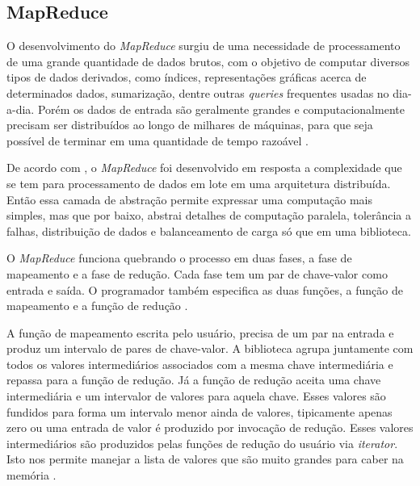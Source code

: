         \subsection{MapReduce}

            O desenvolvimento do \textit{MapReduce} surgiu de uma necessidade de processamento de uma grande
            quantidade de dados brutos, com o objetivo  de computar diversos tipos de dados derivados, como índices,
            representações gráficas acerca de determinados dados, sumarização, dentre outras \textit{queries} frequentes
            usadas no dia-a-dia. Porém os dados de entrada são geralmente grandes e computacionalmente precisam ser
            distribuídos ao longo de milhares de máquinas, para que seja possível de terminar em uma quantidade de
            tempo razoável \cite{dean2008}.

            De acordo com , o \textit{MapReduce} foi desenvolvido em resposta a complexidade
            que se tem para processamento de dados em lote em uma arquitetura distribuída. Então essa camada de
            abstração permite expressar uma computação mais simples, mas que por baixo, abstrai detalhes de computação
            paralela, tolerância a falhas, distribuição de dados e balanceamento de carga só que em uma biblioteca.

            O \textit{MapReduce} funciona quebrando o processo em duas fases, a fase de mapeamento e a fase de
            redução. Cada fase tem um par de chave-valor como entrada e saída. O programador também especifica
            as duas funções, a função de mapeamento e a função de redução \cite{white2015}.

            A função de mapeamento escrita pelo usuário, precisa de um par na entrada e produz um intervalo de pares
            de chave-valor. A biblioteca agrupa juntamente com todos os valores intermediários associados com a
            mesma chave intermediária e repassa para a função de redução. Já a função de redução aceita uma
            chave intermediária e um intervalor de valores para aquela chave. Esses valores são fundidos para
            forma um intervalo menor ainda de valores, tipicamente apenas zero ou uma entrada de valor é produzido
            por invocação de redução. Esses valores intermediários são produzidos pelas funções de redução do
            usuário via \textit{iterator}. Isto nos permite manejar a lista de valores que são muito grandes para
            caber na memória \cite{dean2008}.

